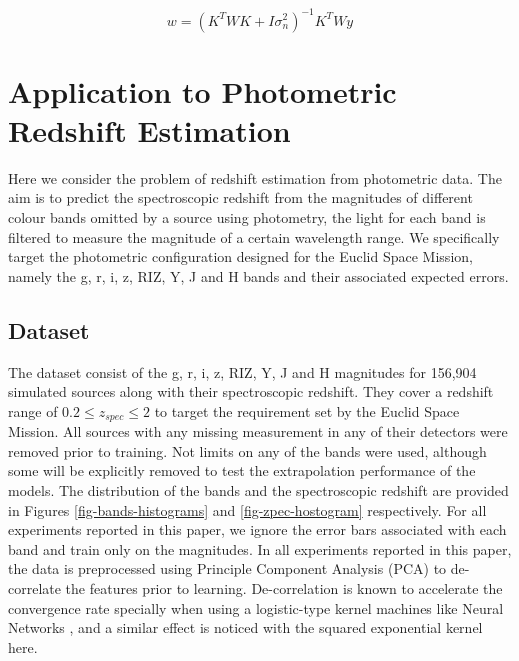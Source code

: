 \documentclass[useAMS,usenatbib,fleqn]{mn2e}
\begin{document}
\begin{equation}
\label{eq-weighted-linear-regression-objective-rectangular}
w = \left(K^{T}WK+I\sigma_{n}^{2} \right)^{-1}K^{T}Wy
\end{equation}

\section{Application to Photometric Redshift Estimation}
\label{sec-application}

Here we consider the problem of redshift estimation from photometric data. The aim is to predict the spectroscopic redshift from the magnitudes of different colour bands omitted by a source using photometry, the light for each band is filtered to measure the magnitude of a certain wavelength range. We specifically target the photometric configuration designed for the Euclid Space Mission, namely the g, r, i, z, RIZ, Y, J and H bands and their associated expected errors. 

\subsection{Dataset}
\label{sec-dataset}

The dataset consist of the g, r, i, z, RIZ, Y, J and H magnitudes for 156,904 simulated sources along with their spectroscopic redshift. They cover a redshift range of $0.2 \le z_{spec} \le 2$ to target the requirement set by the Euclid Space Mission. All sources with any missing measurement in any of their detectors were removed prior to training. Not limits on any of the bands were used, although some will be explicitly removed to test the extrapolation performance of the models. The distribution of the bands and the spectroscopic redshift are provided in Figures \ref{fig-bands-histograms} and \ref{fig-zpec-hostogram} respectively. For all experiments reported in this paper, we ignore the error bars associated with each band and train only on the magnitudes. In all experiments reported in this paper, the data is preprocessed using Principle Component Analysis (PCA) \cite{} to de-correlate the features prior to learning. De-correlation is known to accelerate the convergence rate specially when using a logistic-type kernel machines like Neural Networks \cite{}, and a similar effect is noticed with the squared exponential kernel here.
\end{document}
